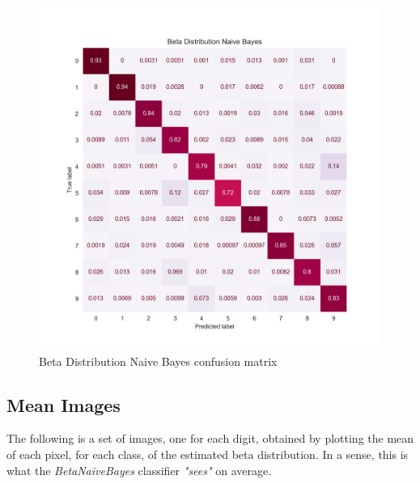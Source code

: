 \begin{figure}[h]
    \centering
    \includegraphics[scale=0.65]{images/exp-results/bayes/beta_bayes_conf-matrix.png}
    \caption{Beta Distribution Naive Bayes confusion matrix}
    \label{fig:exp_res_bayes_conf_mat}
\end{figure}

\subsection{Mean Images}

The following is a set of images, one for each digit, obtained by plotting the mean of each pixel, for each class, of the estimated beta distribution. In a sense, this is what the \textit{BetaNaiveBayes} classifier \textit{"sees"} on average.

